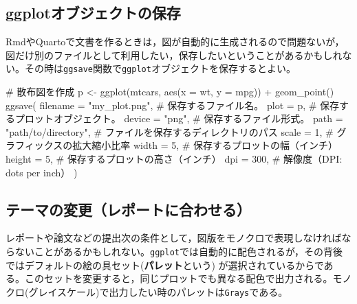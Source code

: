 \documentclass[
  a4paper,
]{ltjsbook}
\newenvironment{Shaded}{\begin{snugshade}}{\end{snugshade}}
\newcommand{\AttributeTok}[1]{\textcolor[rgb]{0.40,0.45,0.13}{#1}}
\newcommand{\CommentTok}[1]{\textcolor[rgb]{0.37,0.37,0.37}{#1}}
\newcommand{\DecValTok}[1]{\textcolor[rgb]{0.68,0.00,0.00}{#1}}
\newcommand{\FunctionTok}[1]{\textcolor[rgb]{0.28,0.35,0.67}{#1}}
\newcommand{\NormalTok}[1]{\textcolor[rgb]{0.00,0.23,0.31}{#1}}
\newcommand{\OtherTok}[1]{\textcolor[rgb]{0.00,0.23,0.31}{#1}}
\newcommand{\SpecialCharTok}[1]{\textcolor[rgb]{0.37,0.37,0.37}{#1}}
\newcommand{\StringTok}[1]{\textcolor[rgb]{0.13,0.47,0.30}{#1}}
\begin{document}
\subsection{ggplotオブジェクトの保存}\label{ggplotux30aaux30d6ux30b8ux30a7ux30afux30c8ux306eux4fddux5b58}

RmdやQuartoで文書を作るときは，図が自動的に生成されるので問題ないが，図だけ別のファイルとして利用したい，保存したいということがあるかもしれない。その時は\texttt{ggsave}関数で\texttt{ggplot}オブジェクトを保存するとよい。

\begin{Shaded}
\begin{Highlighting}[]
\CommentTok{\# 散布図を作成}
\NormalTok{p }\OtherTok{\textless{}{-}} \FunctionTok{ggplot}\NormalTok{(mtcars, }\FunctionTok{aes}\NormalTok{(}\AttributeTok{x =}\NormalTok{ wt, }\AttributeTok{y =}\NormalTok{ mpg)) }\SpecialCharTok{+}
  \FunctionTok{geom\_point}\NormalTok{()}
\FunctionTok{ggsave}\NormalTok{(}
  \AttributeTok{filename =} \StringTok{"my\_plot.png"}\NormalTok{, }\CommentTok{\# 保存するファイル名。}
  \AttributeTok{plot =}\NormalTok{ p, }\CommentTok{\# 保存するプロットオブジェクト。}
  \AttributeTok{device =} \StringTok{"png"}\NormalTok{, }\CommentTok{\# 保存するファイル形式。}
  \AttributeTok{path =} \StringTok{"path/to/directory"}\NormalTok{, }\CommentTok{\# ファイルを保存するディレクトリのパス}
  \AttributeTok{scale =} \DecValTok{1}\NormalTok{, }\CommentTok{\# グラフィックスの拡大縮小比率}
  \AttributeTok{width =} \DecValTok{5}\NormalTok{, }\CommentTok{\# 保存するプロットの幅（インチ）}
  \AttributeTok{height =} \DecValTok{5}\NormalTok{, }\CommentTok{\# 保存するプロットの高さ（インチ）}
  \AttributeTok{dpi =} \DecValTok{300}\NormalTok{, }\CommentTok{\# 解像度（DPI: dots per inch）}
\NormalTok{)}
\end{Highlighting}
\end{Shaded}

\subsection{テーマの変更（レポートに合わせる）}\label{ux30c6ux30fcux30deux306eux5909ux66f4ux30ecux30ddux30fcux30c8ux306bux5408ux308fux305bux308b}

レポートや論文などの提出次の条件として，図版をモノクロで表現しなければならないことがあるかもしれない。\texttt{ggplot}では自動的に配色されるが，その背後ではデフォルトの絵の具セット(\textbf{パレット}という)
が選択されているからである。このセットを変更すると，同じプロットでも異なる配色で出力される。モノクロ(グレイスケール)で出力したい時のパレットは\texttt{Grays}である。
\end{document}
